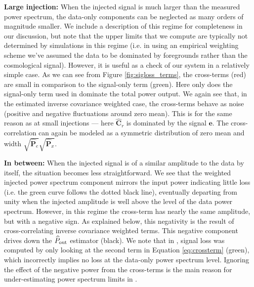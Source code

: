 \documentclass[preprint2,numberedappendix,tighten]{aastex6}
\begin{document}
{\bf Large injection:}
When the injected signal is much larger than the measured power spectrum, the data-only components can 
be neglected as many orders of magnitude smaller. We include a description of this regime for completeness in our discussion, but note that the upper limits that we compute are typically not determined by simulations in this regime (i.e. in using an empirical weighting scheme we've assumed the data to be dominated by foregrounds rather than the cosmological signal).  However, it is useful as a check of our system in a relatively simple case. As we can see from Figure \ref{fig:sigloss_terms}, the cross-terms (red) are small in comparison to the signal-only term (green). Here only does the signal-only term used in   dominate the total power output. We again see that, in the estimated inverse covariance weighted case, the cross-terms behave as noise (positive and negative fluctuations around zero mean). This is for the same reason as at small injections --- here $\widehat{\textbf{C}}_{r}$ is dominated by the signal $\textbf{e}$. The cross-correlation can again be modeled as a symmetric distribution of zero mean and width $\sqrt{\widehat{\textbf{P}}_e}\sqrt{\widehat{\textbf{P}}_x}$.

{\bf In between:}
When the injected signal is of a similar amplitude to the data by itself, the situation becomes less straightforward. We see that 
the weighted injected power spectrum component mirrors the input power indicating little loss (i.e. the green curve follows the dotted black line), eventually 
departing from unity when the injected amplitude is well above the level of the data power spectrum. However, 
in this regime the cross-term has nearly the same amplitude, but with a negative sign. As explained below, this negativity is the result of cross-correlating inverse covariance weighted terms.  This negative component drives down the $\widehat{P}_{\rm out}$ estimator (black). We note that in , signal loss was computed by only looking at the second term in Equation \eqref{eq:crossterm} (green), which incorrectly implies no loss at the data-only power spectrum level. Ignoring the effect of the negative power from the cross-terms is the main reason for under-estimating power spectrum limits in .
\end{document}
